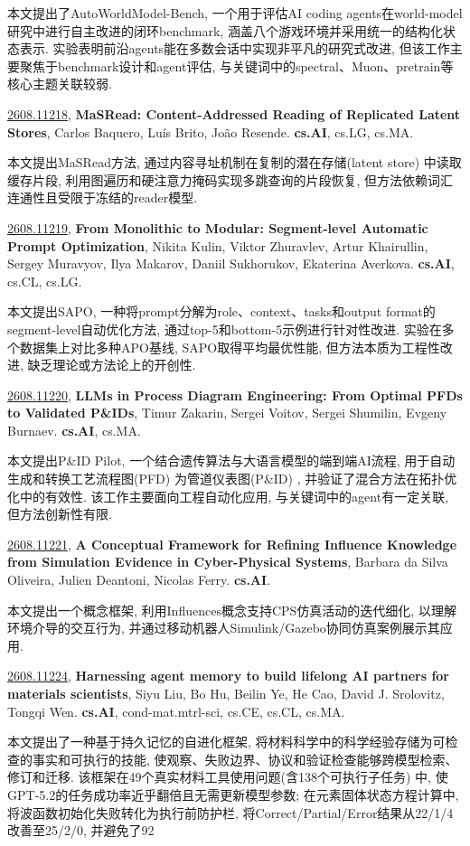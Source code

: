 \documentclass[9pt, a4paper]{article}
\theoremstyle{plain}
\theoremstyle{definition}
\theoremstyle{remark}
\newcommand{\arxivwithtarget}[3]{\hypertarget{#1}{}\href{https://arxiv.org/abs/#1}{#1}, \textbf{\textcolor{arxivblue}{#2}}, #3. }
\begin{document}
本文提出了AutoWorldModel-Bench, 一个用于评估AI coding agents在world-model研究中进行自主改进的闭环benchmark, 涵盖八个游戏环境并采用统一的结构化状态表示. 实验表明前沿agents能在多数会话中实现非平凡的研究式改进, 但该工作主要聚焦于benchmark设计和agent评估, 与关键词中的spectral、Muon、pretrain等核心主题关联较弱.


\arxivwithtarget{2608.11218}{MaSRead: Content-Addressed Reading of Replicated Latent Stores}{Carlos Baquero, Luís Brito, João Resende}\textbf{cs.AI}, cs.LG, cs.MA.

本文提出MaSRead方法, 通过内容寻址机制在复制的潜在存储(latent store) 中读取缓存片段, 利用图遍历和硬注意力掩码实现多跳查询的片段恢复, 但方法依赖词汇连通性且受限于冻结的reader模型.


\arxivwithtarget{2608.11219}{From Monolithic to Modular: Segment-level Automatic Prompt Optimization}{Nikita Kulin, Viktor Zhuravlev, Artur Khairullin, Sergey Muravyov, Ilya Makarov, Daniil Sukhorukov, Ekaterina Averkova}\textbf{cs.AI}, cs.CL, cs.LG.

本文提出SAPO, 一种将prompt分解为role、context、tasks和output format的segment-level自动优化方法, 通过top-5和bottom-5示例进行针对性改进. 实验在多个数据集上对比多种APO基线, SAPO取得平均最优性能, 但方法本质为工程性改进, 缺乏理论或方法论上的开创性.


\arxivwithtarget{2608.11220}{LLMs in Process Diagram Engineering: From Optimal PFDs to Validated P&IDs}{Timur Zakarin, Sergei Voitov, Sergei Shumilin, Evgeny Burnaev}\textbf{cs.AI}, cs.MA.

本文提出P&ID Pilot, 一个结合遗传算法与大语言模型的端到端AI流程, 用于自动生成和转换工艺流程图(PFD) 为管道仪表图(P&ID) , 并验证了混合方法在拓扑优化中的有效性. 该工作主要面向工程自动化应用, 与关键词中的agent有一定关联, 但方法创新性有限.


\arxivwithtarget{2608.11221}{A Conceptual Framework for Refining Influence Knowledge from Simulation Evidence in Cyber-Physical Systems}{Barbara da Silva Oliveira, Julien Deantoni, Nicolas Ferry}\textbf{cs.AI}.

本文提出一个概念框架, 利用Influences概念支持CPS仿真活动的迭代细化, 以理解环境介导的交互行为, 并通过移动机器人Simulink/Gazebo协同仿真案例展示其应用.


\arxivwithtarget{2608.11224}{Harnessing agent memory to build lifelong AI partners for materials scientists}{Siyu Liu, Bo Hu, Beilin Ye, He Cao, David J. Srolovitz, Tongqi Wen}\textbf{cs.AI}, cond-mat.mtrl-sci, cs.CE, cs.CL, cs.MA.

本文提出了一种基于持久记忆的自进化框架, 将材料科学中的科学经验存储为可检查的事实和可执行的技能, 使观察、失败边界、协议和验证检查能够跨模型检索、修订和迁移. 该框架在49个真实材料工具使用问题(含138个可执行子任务) 中, 使GPT-5.2的任务成功率近乎翻倍且无需更新模型参数; 在元素固体状态方程计算中, 将波函数初始化失败转化为执行前防护栏, 将Correct/Partial/Error结果从22/1/4改善至25/2/0, 并避免了92%
\end{document}
